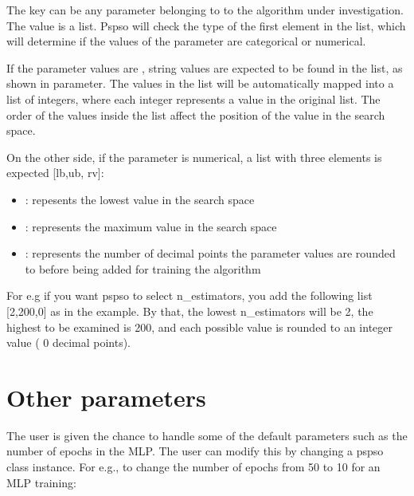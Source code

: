 \documentclass[letterpaper,10pt,english]{sphinxmanual}
\begin{document}
The key can be any parameter belonging to to the algorithm under investigation.
The value is a list.
Pspso will check the type of the first element in the list, which will determine if the values of the parameter are categorical or numerical.


If the parameter values are , string values are expected to be found in the list, as shown in  parameter.
The values in the list will be automatically mapped into a list of integers, where each integer represents a value in the original list.
The order of the values inside the list affect the position of the value in the search space.


On the other side, if the parameter is numerical, a list with three elements is expected {[}lb,ub, rv{]}:
\begin{itemize}
\item {} 
: repesents the lowest value in the search space

\item {} 
: represents the maximum value in the search space

\item {} 
: represents the number of decimal points the parameter values are rounded to before being added for training the algorithm

\end{itemize}

For e.g if you want pspso to select n\_estimators, you add the following list {[}2,200,0{]} as in the example.
By that, the lowest n\_estimators will be 2, the highest to be examined is 200, and each possible value is rounded to an integer value ( 0 decimal points).


\section{Other parameters}
\label{\detokenize{index:other-parameters}}
The user is given the chance to handle some of the default parameters
such as the number of epochs in the MLP. The user can modify this by changing a
pspso class instance. For e.g., to change the number of
epochs from 50 to 10 for an MLP training:
\end{document}
